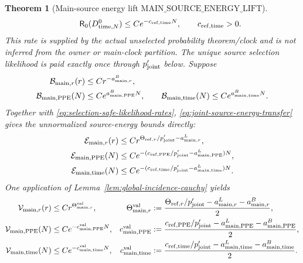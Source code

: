 \documentclass[11pt]{article}
\newtheorem{theorem}{Theorem}[section]
\begin{document}
\begin{theorem}[Main-source energy lift
$\mathrm{MAIN\_SOURCE\_ENERGY\_LIFT}$]
\begin{equation}
 \qquad \mathsf R_0(D_{{\rm time},N}^{0})
 \le Ce^{-c_{{\rm ref},{\rm time}}N},
 \qquad c_{{\rm ref},{\rm time}}>0.
\end{equation}
This rate is supplied by the actual unselected probability theorem/clock and
is not inferred from the owner or main-clock partition.  The unique source
selection likelihood is paid exactly once through $p_{\rm joint}'$ below.
Suppose
\begin{align}
\label{eq:main-source-base-mass}
 \mathcal B_{{\rm main},r}(r)&\le Cr^{-a_{{\rm main},r}^{B}},\notag\\
 \mathcal B_{{\rm main},{\rm PPE}}(N)
 &\le Ce^{a_{{\rm main},{\rm PPE}}^{B}N},\qquad
 \mathcal B_{{\rm main},{\rm time}}(N)
 \le Ce^{a_{{\rm main},{\rm time}}^{B}N}.
\end{align}
Together with \eqref{eq:selection-safe-likelihood-rates},
\eqref{eq:joint-source-energy-transfer} gives the \emph{unnormalized}
source-energy bounds directly:
\begin{align}
 \mathcal E_{{\rm main},r}(r)&\le
 Cr^{\Theta_{{\rm ref},r}/p_{\rm joint}'-a_{{\rm main},r}^{L}},\notag\\
 \mathcal E_{{\rm main},{\rm PPE}}(N)&\le
 Ce^{-(c_{{\rm ref},{\rm PPE}}/p_{\rm joint}'
       -a_{{\rm main},{\rm PPE}}^{L})N},\notag\\
 \mathcal E_{{\rm main},{\rm time}}(N)&\le
 Ce^{-(c_{{\rm ref},{\rm time}}/p_{\rm joint}'
       -a_{{\rm main},{\rm time}}^{L})N}.
 \label{eq:source-energy-bound}
\end{align}
One application of Lemma~\ref{lem:global-incidence-cauchy} yields
\begin{align}
 \mathcal V_{{\rm main},r}(r)&\le
 Cr^{\Theta_{{\rm main},r}^{\rm val}},&
 \Theta_{{\rm main},r}^{\rm val}&:=
 \frac{\Theta_{{\rm ref},r}/p_{\rm joint}'
             -a_{{\rm main},r}^{L}-a_{{\rm main},r}^{B}}2,\notag\\
 \mathcal V_{{\rm main},{\rm PPE}}(N)&\le
 Ce^{-c_{{\rm main},{\rm PPE}}^{\rm val}N},&
 c_{{\rm main},{\rm PPE}}^{\rm val}&:=
 \frac{c_{{\rm ref},{\rm PPE}}/p_{\rm joint}'
             -a_{{\rm main},{\rm PPE}}^{L}
             -a_{{\rm main},{\rm PPE}}^{B}}2,\notag\\
 \mathcal V_{{\rm main},{\rm time}}(N)&\le
 Ce^{-c_{{\rm main},{\rm time}}^{\rm val}N},&
 c_{{\rm main},{\rm time}}^{\rm val}&:=
 \frac{c_{{\rm ref},{\rm time}}/p_{\rm joint}'
             -a_{{\rm main},{\rm time}}^{L}
             -a_{{\rm main},{\rm time}}^{B}}2.
 \label{eq:source-value-small-ball}
\end{align}

\end{theorem}
\end{document}

